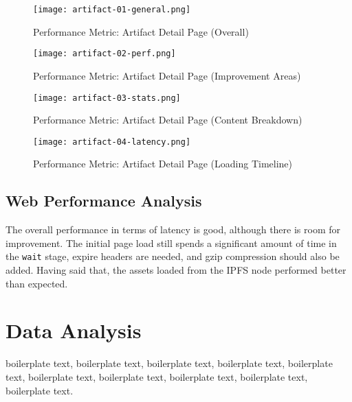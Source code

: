 \begin{figure}[H]
    \centering
    \texttt{[image: artifact-01-general.png]}
    \caption[Performance Metric: Artifact Detail Page (Overall)]{Performance Metric: Artifact Detail Page (Overall)}
    \label{fig:artifact-01-general}
\end{figure}

\begin{figure}[H]
    \centering
    \texttt{[image: artifact-02-perf.png]}
    \caption[Performance Metric: Artifact Detail Page (Improvement Areas)]{Performance Metric: Artifact Detail Page (Improvement Areas)}
    \label{fig:artifact-02-perf.png}
\end{figure}

\begin{figure}[H]
    \centering
    \texttt{[image: artifact-03-stats.png]}
    \caption[Performance Metric: Artifact Detail Page (Content Breakdown)]{Performance Metric: Artifact Detail Page (Content Breakdown)}
    \label{fig:artifact-03-stats.png}
\end{figure}

\begin{figure}[H]
    \centering
    \texttt{[image: artifact-04-latency.png]}
    \caption[Performance Metric: Artifact Detail Page (Loading Timeline)]{Performance Metric: Artifact Detail Page (Loading Timeline)}
    \label{fig:artifact-04-latency.png}
\end{figure}


\subsection{Web Performance Analysis}

The overall performance in terms of latency is good, although there is room for improvement. The initial page load still spends a significant amount of time in the \texttt{wait} stage, expire headers are needed, and gzip compression should also be added. Having said that, the assets loaded from the IPFS node performed better than expected.




\section{Data Analysis}

boilerplate text, boilerplate text, boilerplate text, boilerplate text, boilerplate text, boilerplate text, boilerplate text, boilerplate text, boilerplate text, boilerplate text.

